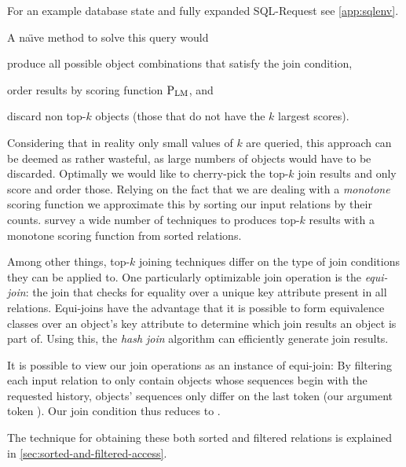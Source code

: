 For an example database state and fully expanded SQL-Request see
\cref{app:sqlenv}.

A na\"{\i}ve method to solve this query would
\begin{inparaenum}[(1)]
  \item produce all possible object combinations that satisfy the join
    condition,
  \item order results by scoring function $\Prob[\text{LM}]$, and
  \item discard non top-$k$ objects (those that do not have the $k$ largest
    scores).
\end{inparaenum}

Considering that in reality only small values of $k$ are queried, this approach
can be deemed as rather wasteful, as large numbers of objects would have to be
discarded.
Optimally we would like to cherry-pick the top-$k$ join results and only
score and order those.
Relying on the fact that we are dealing with a \emph{monotone} scoring function
we approximate this by sorting our input relations by their counts.
\textcite{Ilyas2008} survey a wide number of techniques to produces top-$k$ results
with a monotone scoring function from sorted relations.

Among other things, top-$k$ joining techniques differ on the type of join
conditions they can be applied to.
One particularly optimizable join operation is the \emph{equi-join}:
the join that checks for equality over a unique key attribute present in all
relations.
Equi-joins have the advantage that it is possible to form equivalence classes
over an object's key attribute to determine which join results an object is
part of.
Using this, the \emph{hash join} algorithm can efficiently generate join
results.

It is possible to view our join operations as an instance of equi-join:
By filtering each input relation  to only contain
objects whose sequences begin with the requested history, objects'
sequences only differ on the last token (our argument token ).
Our join condition thus reduces to
.


The technique for obtaining these both sorted and filtered relations is
explained in \cref{sec:sorted-and-filtered-access}.

